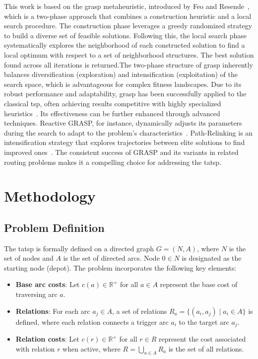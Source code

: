 \documentclass[twocolumn, switch]{article} %
\begin{document}
This work is based on the \gls{grasp} metaheuristic, introduced by Feo and Resende~\cite{Feo1995}, which is a two-phase approach that combines a construction heuristic and a local search procedure.
The construction phase leverages a greedy randomized strategy to build a diverse set of feasible solutions. Following this, the local search phase systematically explores the neighborhood of each constructed solution to find a local optimum with respect to a set of neighborhood structures.
The best solution found across all iterations is returned.The two-phase structure of \gls{grasp} inherently balances diversification (exploration) and intensification (exploitation) of the search space, which is advantageous for complex fitness landscapes.
Due to its robust performance and adaptability, \gls{grasp} has been successfully applied to the classical \gls{tsp}, often achieving results competitive with highly specialized heuristics~\cite{Oliveira2004}. 
Its effectiveness can be further enhanced through advanced techniques. Reactive GRASP, for instance, dynamically adjusts its parameters during the search to adapt to the problem's characteristics~\cite{Prais2000}. 
Path-Relinking is an intensification strategy that explores trajectories between elite solutions to find improved ones~\cite{Resende2019}. The consistent success of GRASP and its variants in related routing problems makes it a compelling choice for addressing the \gls{tatsp}.

\section{Methodology}

\subsection{Problem Definition}

The \gls{tatsp} is formally defined on a directed graph $G = (N, A)$, where $N$ is the set of nodes and $A$ is the set of directed arcs. Node $0 \in N$ is designated as the starting node (depot). The problem incorporates the following key elements:

\begin{itemize}
\item \textbf{Base arc costs}: Let $c(a) \in \mathbb{R}^+$ for all $a \in A$ represent the base cost of traversing arc $a$.
\item \textbf{Relations}: For each arc $a_j \in A$, a set of relations $R_a = \{(a_i, a_j) \mid a_i \in A\}$ is defined, where each relation connects a trigger arc $a_i$ to the target arc $a_j$.
\item \textbf{Relation costs}: Let $c(r) \in \mathbb{R}^+$ for all $r \in R$ represent the cost associated with relation $r$ when active, where $R = \bigcup_{a \in A} R_a$ is the set of all relations.
\end{itemize}
\end{document}
